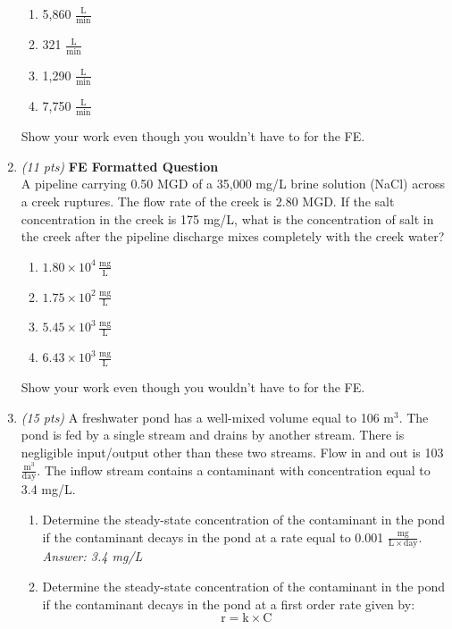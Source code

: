 \documentclass[12pt,letterpaper]{article}
\begin{document}
\begin{enumerate}
\begin{enumerate}
\item 5,860 $\mathrm{\frac{L}{min}}$
\item 321 $\mathrm{\frac{L}{min}}$
\item 1,290 $\mathrm{\frac{L}{min}}$
\item 7,750 $\mathrm{\frac{L}{min}}$
\end{enumerate}
Show your work even though you wouldn't have to for the FE.


\item \emph{(11 pts)} \textbf{FE Formatted Question}\\
A pipeline carrying 0.50 MGD of a 35,000 mg/L brine solution (NaCl) across a creek ruptures.  The flow rate of the creek is 2.80 MGD.  If the salt concentration in the creek is 175 mg/L, what is the concentration of salt in the creek after the pipeline discharge mixes completely with the creek water?

\begin{enumerate}
\item $\mathrm{1.80\times 10^4\, \frac{mg}{L}}$
\item $\mathrm{1.75\times 10^2\, \frac{mg}{L}}$
\item $\mathrm{5.45\times 10^3\, \frac{mg}{L}}$
\item $\mathrm{6.43\times 10^3\, \frac{mg}{L}}$
\end{enumerate}
Show your work even though you wouldn't have to for the FE.


\item \emph{(15 pts)} A freshwater pond has a well-mixed volume equal to 106 $\mathrm{m^3}$.   The pond is fed by a single stream and drains by another stream.  There is negligible input/output other than these two streams.  Flow in and out is 103 $\mathrm{\frac{m^3}{day}}$.  The inflow stream contains a contaminant with concentration equal to 3.4 mg/L. 

\begin{enumerate}
\item Determine the steady-state concentration of the contaminant in the pond if the contaminant decays in the pond at a rate equal to 0.001 $\mathrm{\frac{mg}{L\times day}}$.\\
\emph{Answer: 3.4 mg/L}
 
\item Determine the steady-state concentration of the contaminant in the pond if the contaminant decays in the pond at a first order rate given by:
\begin{equation*}
\mathrm{r = k\times C}
\end{equation*} 


\end{enumerate}
\end{enumerate}
\end{document}
